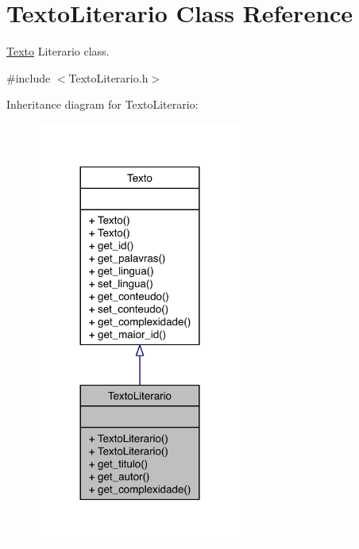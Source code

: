 \hypertarget{class_texto_literario}{\section{Texto\-Literario Class Reference}
\label{class_texto_literario}
}


\hyperlink{class_texto}{Texto} Literario class.  




{\ttfamily \#include $<$Texto\-Literario.\-h$>$}



Inheritance diagram for Texto\-Literario\-:
\nopagebreak
\begin{figure}[H]
\begin{center}
\leavevmode
\includegraphics[width=192pt]{class_texto_literario__inherit__graph}
\end{center}
\end{figure}
